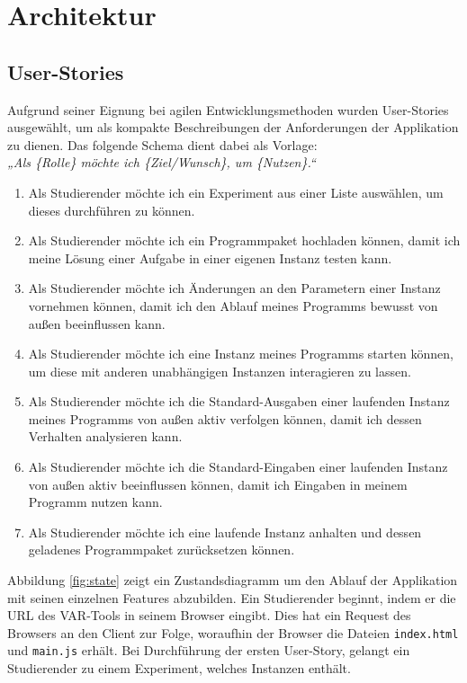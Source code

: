 \section{Architektur}
\subsection{User-Stories}
Aufgrund seiner Eignung bei agilen Entwicklungsmethoden wurden User-Stories ausgewählt, um als kompakte Beschreibungen der Anforderungen der Applikation zu dienen.
Das folgende Schema dient dabei als Vorlage: \\\textit{„Als \{Rolle\} möchte ich \{Ziel/Wunsch\}, um \{Nutzen\}.“}
\begin{enumerate}
  \item Als Studierender möchte ich ein Experiment aus einer Liste auswählen, um dieses durchführen zu können.
  \item Als Studierender möchte ich ein Programmpaket hochladen können, damit ich meine Lösung einer Aufgabe in einer eigenen Instanz testen kann.
  \item Als Studierender möchte ich Änderungen an den Parametern einer Instanz vornehmen können, damit ich den Ablauf meines Programms bewusst von außen beeinflussen kann.
  \item Als Studierender möchte ich eine Instanz meines Programms starten können, um diese mit anderen unabhängigen Instanzen interagieren zu lassen.
  \item Als Studierender möchte ich die Standard-Ausgaben einer laufenden Instanz meines Programms von außen aktiv verfolgen können, damit ich dessen Verhalten analysieren kann.
  \item Als Studierender möchte ich die Standard-Eingaben einer laufenden Instanz von außen aktiv beeinflussen können, damit ich Eingaben in meinem Programm nutzen kann.
  \item Als Studierender möchte ich eine laufende Instanz anhalten und dessen geladenes Programmpaket zurücksetzen können.
\end{enumerate}
Abbildung \ref{fig:state} zeigt ein Zustandsdiagramm um den Ablauf der Applikation mit seinen einzelnen Features abzubilden.
Ein Studierender beginnt, indem er die URL des VAR-Tools in seinem Browser eingibt.
Dies hat ein Request des Browsers an den Client zur Folge, woraufhin der Browser die Dateien \texttt{index.html} und \texttt{main.js} erhält.
Bei Durchführung der ersten User-Story, gelangt ein Studierender zu einem Experiment, welches Instanzen enthält.
